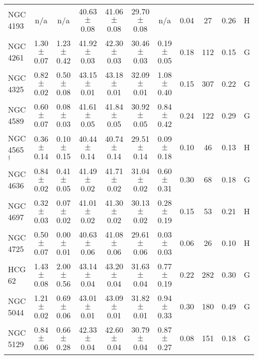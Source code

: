 \begin{table*}
\begin{center}
\begin{tabular}{@{}lcccccccccl@{}}
NGC 4193             &  n/a              &  n/a              &  40.63 $\pm$ 0.08  &  41.06  $\pm$ 0.08  &  29.70 $\pm$ 0.08  &  n/a              &  0.04         &  27                 &  0.26                &  H      \\
NGC 4261             &  1.30 $\pm$ 0.07  &  1.23 $\pm$ 0.42  &  41.92 $\pm$ 0.03  &  42.30  $\pm$ 0.03  &  30.46 $\pm$ 0.03  &  0.19 $\pm$ 0.05  &  0.18         &  112                &  0.15                &  G      \\
NGC 4325             &  0.82 $\pm$ 0.02  &  0.50 $\pm$ 0.08  &  43.15 $\pm$ 0.01  &  43.18  $\pm$ 0.01  &  32.09 $\pm$ 0.01  &  1.08 $\pm$ 0.40  &  0.15         &  307                &  0.22                &  G      \\
NGC 4589             &  0.60 $\pm$ 0.07  &  0.08 $\pm$ 0.03  &  41.61 $\pm$ 0.05  &  41.84  $\pm$ 0.05  &  30.92 $\pm$ 0.05  &  0.84 $\pm$ 0.42  &  0.24         &  122                &  0.29                &  G      \\
NGC 4565$^{\dagger}$ &  0.36 $\pm$ 0.14  &  0.10 $\pm$ 0.15  &  40.44 $\pm$ 0.14  &  40.74  $\pm$ 0.14  &  29.51 $\pm$ 0.14  &  0.09 $\pm$ 0.18  &  0.10         &  46                 &  0.13                &  H      \\
NGC 4636             &  0.84 $\pm$ 0.02  &  0.41 $\pm$ 0.05  &  41.49 $\pm$ 0.02  &  41.71  $\pm$ 0.02  &  31.04 $\pm$ 0.02  &  0.60 $\pm$ 0.31  &  0.30         &  68                 &  0.18                &  G      \\
NGC 4697             &  0.32 $\pm$ 0.03  &  0.07 $\pm$ 0.02  &  41.01 $\pm$ 0.02  &  41.30  $\pm$ 0.02  &  30.13 $\pm$ 0.02  &  0.28 $\pm$ 0.19  &  0.15         &  53                 &  0.21                &  H      \\
NGC 4725             &  0.50 $\pm$ 0.07  &  0.00 $\pm$ 0.01  &  40.63 $\pm$ 0.06  &  41.08  $\pm$ 0.06  &  29.61 $\pm$ 0.06  &  0.03 $\pm$ 0.03  &  0.06         &  26                 &  0.10                &  H      \\
HCG 62               &  1.43 $\pm$ 0.08  &  2.00 $\pm$ 0.56  &  43.14 $\pm$ 0.04  &  43.20  $\pm$ 0.04  &  31.63 $\pm$ 0.04  &  0.77 $\pm$ 0.19  &  0.22         &  282                &  0.30                &  G      \\
NGC 5044             &  1.21 $\pm$ 0.02  &  0.69 $\pm$ 0.06  &  43.01 $\pm$ 0.01  &  43.09  $\pm$ 0.01  &  31.82 $\pm$ 0.01  &  0.94 $\pm$ 0.33  &  0.30         &  180                &  0.49                &  G      \\
NGC 5129             &  0.84 $\pm$ 0.06  &  0.66 $\pm$ 0.28  &  42.33 $\pm$ 0.04  &  42.60  $\pm$ 0.04  &  30.79 $\pm$ 0.04  &  0.87 $\pm$ 0.27  &  0.08         &  151                &  0.18                &  G      \\

\end{tabular}
\end{center}
\end{table*}
